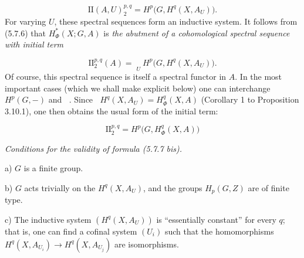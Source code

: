 \[
\mathrm {II}(A,U)_2^{p,q}=H^p\bigl(G,H^q(X,A_U)\bigr).
\]
For varying $U$, these spectral sequences form an inductive system. It follows
from (5.7.6) that $H_\Phi^*(X;G,A)$ is \textit{the abutment of a
cohomological spectral sequence with initial term}

\begin{equation}
\mathrm {II}_2^{p,q}(A)=\mathop{\underset{\to}{\lim.}}\limits_U H^p\bigl(G,H^q(X,A_U)\bigr).
\tag{5.7.7}
\end{equation}
Of course, this spectral sequence is itself a spectral functor in $A$. In the
most important cases (which we shall make explicit below) one can interchange
$H^p(G,-)$ and $\mathop{\underset{\to}{\lim.}}$. Since
$\mathop{\underset{\to}{\lim.}} H^q(X,A_U)=H_\Phi^q(X,A)$ (Corollary 1 to Proposition 3.10.1), one
then obtains the usual form of the initial term:

\begin{equation}
\mathrm {II}_2^{p,q}=H^p\bigl(G,H_\Phi^q(X,A)\bigr)
\tag{5.7.7 bis}
\end{equation}

\noindent\textit{Conditions for the validity of formula \textup{(5.7.7 bis).}}

a) $G$ is a finite group.

b) $G$ acts trivially on the $H^q(X,A_U)$, and the groups
$H_p(G,Z)$ are of finite type.

c) The inductive system $(H^q(X,A_U))$ is ``essentially constant''
for every $q$; that is, one can find a cofinal system $(U_i)$ such that the
homomorphisms $H^q(X,A_{U_i})\to H^q(X,A_{U_j})$ are isomorphisms.

